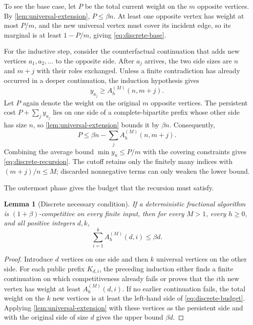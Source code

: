 \documentclass[11pt,letterpaper]{article}
\newcommand{\cref}[1]{\autoref{#1}}
\newtheorem{lemma}[theorem]{Lemma}
\theoremstyle{definition}
\theoremstyle{remark}
\begin{document}
To see the base case, let $P$ be the total current weight on the $m$ opposite vertices.
By \cref{lem:universal-extension}, $P\le\beta n$.
At least one opposite vertex has weight at most $P/m$, and the new universal vertex must cover its incident edge, so its marginal is at least $1-P/m$, giving \cref{eq:discrete-base}.

For the inductive step, consider the counterfactual continuation that adds new vertices $a_1,a_2,\ldots$ to the opposite side.
After $a_j$ arrives, the two side sizes are $n$ and $m+j$ with their roles exchanged.
Unless a finite contradiction has already occurred in a deeper continuation, the induction hypothesis gives
\begin{equation}\label{eq:future-lower} y_{a_j}\ge A_h^{(M)}(n,m+j). \end{equation}
Let $P$ again denote the weight on the original $m$ opposite vertices.
The persistent cost $P+\sum_jy_{a_j}$ lies on one side of a complete-bipartite prefix whose other side has size $n$, so \cref{lem:universal-extension} bounds it by $\beta n$.
Consequently,
\begin{equation}\label{eq:old-side-upper} P\le\beta n-\sum_j A_h^{(M)}(n,m+j). \end{equation}
Combining the average bound $\min y_u\le P/m$ with the covering constraints gives \cref{eq:discrete-recursion}.
The cutoff retains only the finitely many indices with $(m+j)/n\le M$; discarded nonnegative terms can only weaken the lower bound.

The outermost phase gives the budget that the recursion must satisfy.

\begin{lemma}[Discrete necessary condition]\label{lem:discrete-budget}
If a deterministic fractional algorithm is $(1+\beta)$-competitive on every finite input, then for every $M>1$, every $h\ge0$, and all positive integers $d,k$,
\begin{equation}\label{eq:discrete-budget} \sum_{i=1}^{k}A_h^{(M)}(d,i)\le\beta d. \end{equation}
\end{lemma}

\begin{proof}
Introduce $d$ vertices on one side and then $k$ universal vertices on the other side.
For each public prefix $K_{d,i}$, the preceding induction either finds a finite continuation on which competitiveness already fails or proves that the $i$th new vertex has weight at least $A_h^{(M)}(d,i)$.
If no earlier continuation fails, the total weight on the $k$ new vertices is at least the left-hand side of \cref{eq:discrete-budget}.
Applying \cref{lem:universal-extension} with these vertices as the persistent side and with the original side of size $d$ gives the upper bound $\beta d$.
\end{proof}
\end{document}
